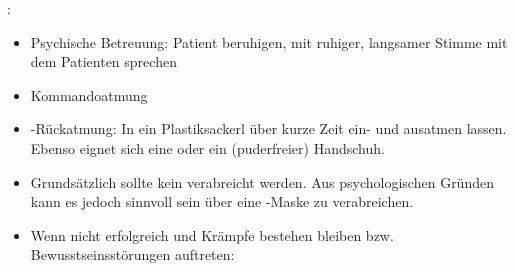
\label{m:Hyperventilationssysndrom} 
:

\begin{itemize}
  \item Psychische Betreuung: Patient beruhigen, mit ruhiger, langsamer Stimme
  mit dem Patienten sprechen
  \item Kommandoatmung
  \item {}-Rückatmung: In ein Plastiksackerl über kurze Zeit ein- und
  ausatmen lassen. Ebenso eignet sich eine  oder ein (puderfreier) 
  Handschuh.
  \item Grundsätzlich sollte kein   verabreicht werden. Aus
  psychologischen Gründen kann es jedoch sinnvoll sein  über eine -Maske zu
  verabreichen.
  \item Wenn nicht erfolgreich und Krämpfe bestehen bleiben bzw.
  Bewusstseinsstörungen auftreten: \TxMassVitMK 
\end{itemize}